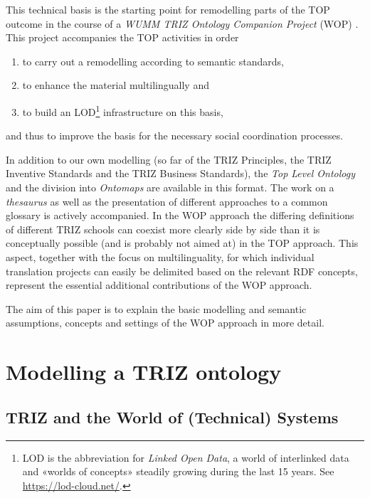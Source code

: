 \documentclass[11pt,a4paper]{article}
\begin{document}
This technical basis is the starting point for remodelling parts of the TOP
outcome in the course of a \emph{WUMM TRIZ Ontology Companion Project} (WOP)
\cite{WOP}.  This project accompanies the TOP activities in order
\begin{enumerate}[noitemsep]
\item to carry out a remodelling according to semantic standards,
\item to enhance the material multilingually and
\item to build an LOD\footnote{LOD is the abbreviation for \emph{Linked Open
    Data}, a world of interlinked data and «worlds of concepts» steadily
  growing during the last 15 years. See \url{https://lod-cloud.net/}.  }
  infrastructure on this basis,
\end{enumerate}
and thus to improve the basis for the necessary social coordination processes.

In addition to our own modelling (so far of the TRIZ Principles, the TRIZ
Inventive Standards and the TRIZ Business Standards), the \emph{Top Level
  Ontology} and the division into \emph{Ontomaps} are available in this
format. The work on a \emph{thesaurus} as well as the presentation of
different approaches to a common glossary is actively accompanied. In the WOP
approach the differing definitions of different TRIZ schools can coexist more
clearly side by side than it is conceptually possible (and is probably not
aimed at) in the TOP approach. This aspect, together with the focus on
multilinguality, for which individual translation projects can easily be
delimited based on the relevant RDF concepts, represent the essential
additional contributions of the WOP approach.

The aim of this paper is to explain the basic modelling and semantic
assumptions, concepts and settings of the WOP approach in more detail. 

\section{Modelling a TRIZ ontology}

\subsection{TRIZ and the World of (Technical) Systems}
\end{document}
